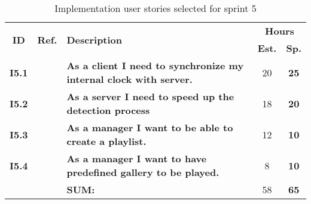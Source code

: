  \def\arraystretch{1.25}
 
\begin{longtable}{ccXcc}
  \label{tab:sprint5stories}\\[-6mm]
\caption{Implementation user stories selected for sprint 5}\\[-4mm]

\toprule[0.5mm]
\multirow{2}{*}{\textbf{ID}} &
\multirow{2}{*}{\textbf{Ref.}} & \multirow{2}{*}{\textbf{Description}} & \multicolumn{2}{c}{\textbf{Hours}} \\
 					& & & \textbf{Est.} & \textbf{Sp.} \\
\midrule
\textbf{I5.1} 	& 	& {\bf As a client I need to synchronize my internal clock with server.}	& 20 & \textbf{25} \\

\textbf{I5.2} 	& 	& {\bf As a server I need to speed up the detection process}				& 18& \textbf{20} \\

\textbf{I5.3} 	& 	& {\bf As a manager I want to be able to create a playlist.} 				& 12 & \textbf{10} \\	

\textbf{I5.4} 	& 	& {\bf As a manager I want to have predefined gallery to be played.} 		& 8 & \textbf{10} \\
	
\midrule
		
				&& \textbf{SUM:}		&		58	& \textbf{65}
 \\																			
\bottomrule[0.5mm]
\end{longtable}
